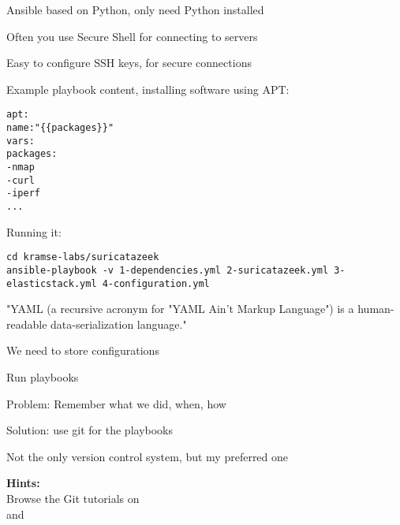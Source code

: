 \documentclass[Screen16to9,17pt]{foils}
\begin{document}


\begin{list2}
\item Ansible based on Python, only need Python installed\\
\item Often you use Secure Shell for connecting to servers\\
\item Easy to configure SSH keys, for secure connections
\end{list2}



Example playbook content, installing software using APT:
\begin{alltt}\small
apt:
    name: "\{\{ packages \}\}"
    vars:
      packages:
        - nmap
        - curl
        - iperf
        ...
\end{alltt}

Running it:
\begin{verbatim}
cd kramse-labs/suricatazeek
ansible-playbook -v 1-dependencies.yml 2-suricatazeek.yml 3-elasticstack.yml 4-configuration.yml
\end{verbatim}

"YAML (a recursive acronym for "YAML Ain't Markup Language") is a human-readable data-serialization language."\\



\begin{list2}
\item We need to store configurations
\item Run playbooks
\item Problem: Remember what we did, when, how
\item Solution: use git for the playbooks
\item Not the only version control system, but my preferred one
\end{list2}


{\bf Hints:}\\
Browse the Git tutorials on \\
and 
\end{document}
